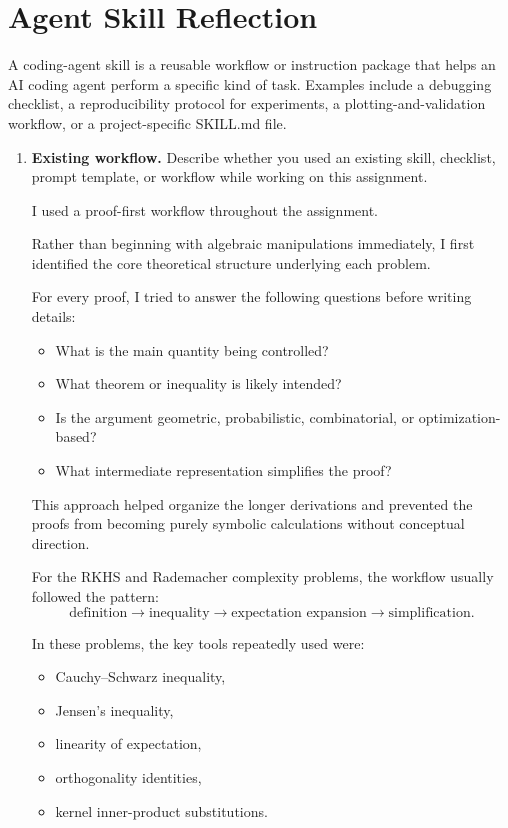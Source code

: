 \documentclass[11pt]{article}
\begin{document}
\section{Agent Skill Reflection}
A coding-agent skill is a reusable workflow or instruction package that helps an AI coding 
agent perform a specific kind of task. Examples include a debugging checklist, a reproducibility 
protocol for experiments, a plotting-and-validation workflow, or a project-specific SKILL.md file.
\begin{enumerate}

\item \textbf{Existing workflow.}
Describe whether you used an existing skill, checklist, prompt template, or workflow while working on this assignment.
\begin{solutionbox}

I used a proof-first workflow throughout the assignment.

Rather than beginning with algebraic manipulations immediately, I first identified the core theoretical structure underlying each problem.

For every proof, I tried to answer the following questions before writing details:
\begin{itemize}
    \item What is the main quantity being controlled?
    \item What theorem or inequality is likely intended?
    \item Is the argument geometric, probabilistic, combinatorial, or optimization-based?
    \item What intermediate representation simplifies the proof?
\end{itemize}

This approach helped organize the longer derivations and prevented the proofs from becoming purely symbolic calculations without conceptual direction.

\medskip

For the RKHS and Rademacher complexity problems, the workflow usually followed the pattern:
\[
\text{definition}
\rightarrow
\text{inequality}
\rightarrow
\text{expectation expansion}
\rightarrow
\text{simplification}.
\]

In these problems, the key tools repeatedly used were:
\begin{itemize}
    \item Cauchy--Schwarz inequality,
    \item Jensen's inequality,
    \item linearity of expectation,
    \item orthogonality identities,
    \item kernel inner-product substitutions.
\end{itemize}


\end{solutionbox}
\end{enumerate}
\end{document}
